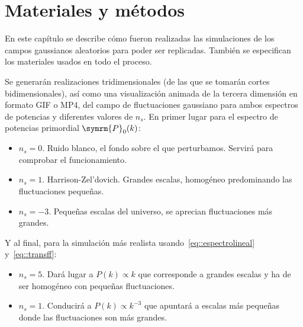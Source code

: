 \chapter{Materiales y métodos}
En este capítulo se describe cómo fueron realizadas las simulaciones de los campos gaussianos aleatorios para poder ser replicadas. También se especifican los materiales usados en todo el proceso.

Se generarán realizaciones tridimensionales (de las que se tomarán cortes bidimensionales), así como una visualización animada de la tercera dimensión en formato GIF o MP4, del campo de fluctuaciones gaussiano para ambos espectros de potencias y diferentes valores de \(n_s\). En primer lugar para el espectro de potencias primordial \(\symrm{P}_0(k)\):
\begin{itemize}
    \item \(n_s=0\). Ruido blanco, el fondo sobre el que perturbamos. Servirá para comprobar el funcionamiento.
    \item \(n_s=1\). Harrison-Zel'dovich. Grandes escalas, homogéneo predominando las fluctuaciones pequeñas.
    \item \(n_s=-3\). Pequeñas escalas del universo, se aprecian fluctuaciones más grandes.
\end{itemize}
Y al final, para la simulación más realista usando~\ref{eq::espectrolineal} y~\ref{eq::transff}:
\begin{itemize}
    \item \(n_s=5\). Dará lugar a \(P(k)\propto k\) que corresponde a grandes escalas y ha de ser homogéneo con pequeñas fluctuaciones.
    \item \(n_s=1\). Conducirá a \(P(k)\propto k^{-3}\) que apuntará a escalas más pequeñas donde las fluctuaciones son más grandes.
\end{itemize}

